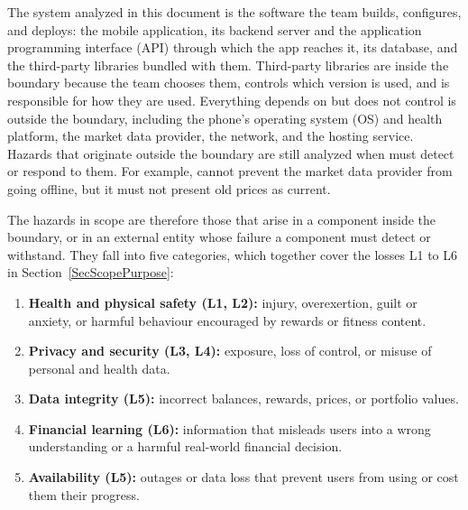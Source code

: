 \documentclass{article}
\begin{document}


The system analyzed in this document is the software the team builds,
configures, and deploys: the \progname{} mobile application, its backend
server and the application programming interface (API) through which the app
reaches it, its database, and the third-party libraries bundled with them.
Third-party libraries are inside the boundary because the team chooses them,
controls which version is used, and is responsible for how they are used.
Everything \progname{} depends on but does not control is outside the
boundary, including the phone's operating system (OS) and health platform, the
market data provider, the network, and the hosting service. Hazards that
originate outside the boundary are still analyzed when \progname{} must detect
or respond to them. For example, \progname{} cannot prevent the market data
provider from going offline, but it must not present old prices as current.


The hazards in scope are therefore those that arise in a component inside the
boundary, or in an external entity whose failure a component must detect or
withstand. They fall into five categories, which together cover the losses
L1 to L6 in Section~\ref{SecScopePurpose}:

\begin{enumerate}
  \item \textbf{Health and physical safety (L1, L2):} injury, overexertion,
        guilt or anxiety, or harmful behaviour encouraged by rewards or fitness
        content.
  \item \textbf{Privacy and security (L3, L4):} exposure, loss of control, or misuse of
        personal and health data.
  \item \textbf{Data integrity (L5):} incorrect balances, rewards, prices, or
        portfolio values.
  \item \textbf{Financial learning (L6):} information that misleads users into a
        wrong understanding or a harmful real-world financial decision.
  \item \textbf{Availability (L5):} outages or data loss that prevent users from
        using \progname{} or cost them their progress.
\end{enumerate}
\end{document}
